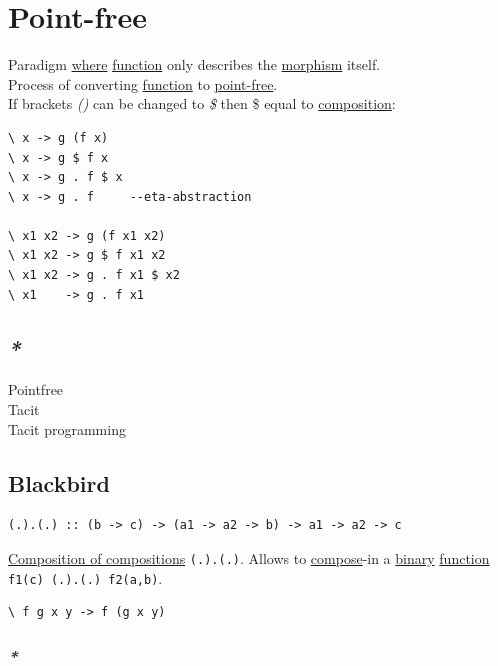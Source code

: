 \documentclass[a4paper,14pt,oneside]{book}
\begin{document}
\chapter{\label{org1ba8ee8}Point-free}
\label{sec:orgf939f2c}
Paradigm \hyperref[orgd3dc8e4]{where} \hyperref[org8cc2ae4]{function} only describes the \hyperref[org2170e98]{morphism} itself.\\

Process of converting \hyperref[org8cc2ae4]{function} to \hyperref[org1ba8ee8]{point-free}.\\
If brackets \emph{()} can be changed to \emph{\$} then \$ equal to \hyperref[orgb060001]{composition}:\\
\begin{verbatim}
\ x -> g (f x)
\ x -> g $ f x
\ x -> g . f $ x
\ x -> g . f     --eta-abstraction

\ x1 x2 -> g (f x1 x2)
\ x1 x2 -> g $ f x1 x2
\ x1 x2 -> g . f x1 $ x2
\ x1    -> g . f x1
\end{verbatim}

\section{\emph{*}}
\label{sec:org603dbe6}

\label{org4e7b359}Pointfree\\
\label{org0e88ff5}Tacit\\
\label{org1937a19}Tacit programming\\

\section{\label{org37306e1}Blackbird}
\label{sec:orge31922f}
\begin{verbatim}
(.).(.) :: (b -> c) -> (a1 -> a2 -> b) -> a1 -> a2 -> c
\end{verbatim}

\hyperref[org34c6a4f]{Composition of compositions} \texttt{(.).(.)}. Allows to \hyperref[org88f76f7]{compose}-in a \hyperref[orgd0575cd]{binary} \hyperref[org8cc2ae4]{function} \texttt{f1(c) (.).(.) f2(a,b)}.\\
\begin{verbatim}
\ f g x y -> f (g x y)
\end{verbatim}

\subsection{\emph{*}}
\label{sec:org6cf3a7e}
\end{document}
